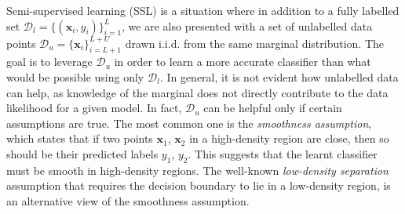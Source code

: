 \documentclass[journal,twoside,web]{ieeecolor}
\begin{document}
Semi-supervised learning (SSL) is a situation where in addition to a
fully labelled set $\mathcal{D}_l = \{ (\mathbf{x}_i, y_i) \}_{i=1}^L$, we are also
presented with a set of unlabelled data points $\mathcal{D}_u = \{
\mathbf{x}_i \}_{i=L+1}^{L+U}$ drawn i.i.d. from the same marginal distribution. 
The goal is to leverage $\mathcal{D}_u$ in order to learn a more accurate classifier
than what would be possible using only $\mathcal{D}_l$. In general, it is not evident how
unlabelled data can help, as knowledge of the
marginal  does not directly contribute to the data likelihood for a given model.
In fact, $\mathcal{D}_u$ can be helpful only if certain assumptions are true.
The most common one is
the \emph{smoothness assumption}, which states that if two points
$\mathbf{x}_1$, $\mathbf{x}_2$ in a high-density  region are close, then so
should be their predicted labels $y_1$, $y_2$. This suggests that the learnt
classifier must be smooth in high-density regions. The well-known
\emph{low-density separation} assumption that requires the decision boundary
to lie in a low-density region, is an alternative view of the smoothness assumption.
\end{document}
